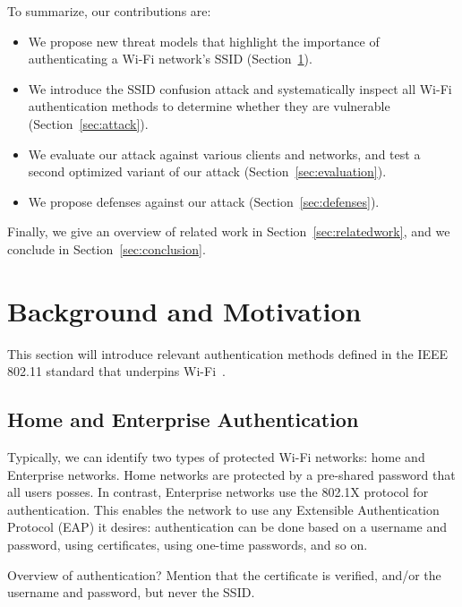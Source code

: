 \documentclass[sigconf,review]{acmart}
\newcommand{\wifi}{\mbox{Wi-Fi}}
\begin{document}
To summarize, our contributions are:
\begin{itemize}
	\item We propose new threat models that highlight the importance of authenticating a \wifi{} network's SSID (Section~\ref{sec:motivation}).

    \item We introduce the SSID confusion attack and systematically inspect all \wifi{} authentication methods to determine whether they are vulnerable (Section~\ref{sec:attack}).

    \item
    We evaluate our attack against various clients and networks, and test a second optimized variant of our attack (Section~\ref{sec:evaluation}).
	
	\item We propose %
	defenses against our attack (Section~\ref{sec:defenses}).
\end{itemize}
Finally, we give an overview of related work in Section~\ref{sec:relatedwork}, and we conclude in Section~\ref{sec:conclusion}.


\section{Background and Motivation}
\label{sec:motivation}

This section will introduce relevant authentication methods defined in the IEEE 802.11 standard that underpins \wifi{}~\cite{ieee80211-2020}.

\subsection{Home and Enterprise Authentication}

Typically, we can identify two types of protected \wifi{} networks: home and Enterprise networks.
Home networks are protected by a pre-shared password that all users posses.
In contrast, Enterprise networks use the 802.1X protocol for authentication.
This enables the network to use any Extensible Authentication Protocol (EAP) it desires: authentication can be done based on a username and password, using certificates, using one-time passwords, and so on.

Overview of authentication? Mention that the certificate is verified, and/or the username and password, but never the SSID.
\end{document}
